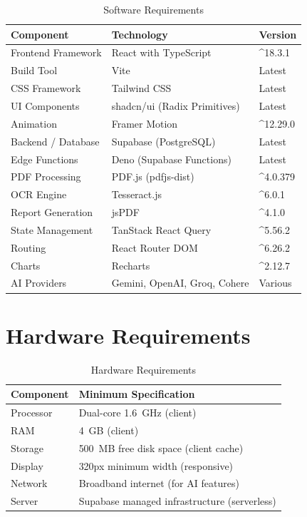 \documentclass[12pt,a4paper,oneside]{report}
\begin{document}
\begin{table}[htbp]
\centering
\caption{Software Requirements}
\label{tab:software}
\small
\begin{tabular}{|p{4cm}|p{5cm}|p{2.5cm}|}
\hline
\textbf{Component} & \textbf{Technology} & \textbf{Version} \\
\hline
Frontend Framework & React with TypeScript & \^{}18.3.1 \\ \hline
Build Tool & Vite & Latest \\ \hline
CSS Framework & Tailwind CSS & Latest \\ \hline
UI Components & shadcn/ui (Radix Primitives) & Latest \\ \hline
Animation & Framer Motion & \^{}12.29.0 \\ \hline
Backend / Database & Supabase (PostgreSQL) & Latest \\ \hline
Edge Functions & Deno (Supabase Functions) & Latest \\ \hline
PDF Processing & PDF.js (pdfjs-dist) & \^{}4.0.379 \\ \hline
OCR Engine & Tesseract.js & \^{}6.0.1 \\ \hline
Report Generation & jsPDF & \^{}4.1.0 \\ \hline
State Management & TanStack React Query & \^{}5.56.2 \\ \hline
Routing & React Router DOM & \^{}6.26.2 \\ \hline
Charts & Recharts & \^{}2.12.7 \\ \hline
AI Providers & Gemini, OpenAI, Groq, Cohere & Various \\ \hline
\end{tabular}
\end{table}

\section{Hardware Requirements}

\begin{table}[htbp]
\centering
\caption{Hardware Requirements}
\label{tab:hardware}
\begin{tabular}{|p{4cm}|p{8cm}|}
\hline
\textbf{Component} & \textbf{Minimum Specification} \\
\hline
Processor & Dual-core 1.6~GHz (client) \\ \hline
RAM & 4~GB (client) \\ \hline
Storage & 500~MB free disk space (client cache) \\ \hline
Display & 320px minimum width (responsive) \\ \hline
Network & Broadband internet (for AI features) \\ \hline
Server & Supabase managed infrastructure (serverless) \\ \hline
\end{tabular}
\end{table}
\end{document}
